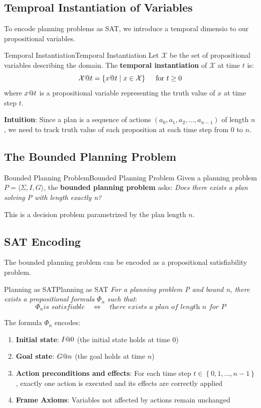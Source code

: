 \documentclass[a4paper]{article}
\theoremstyle{definition}
\begin{document}
\subsection{Temproal Instantiation of Variables}
To encode planning problems as SAT, we introduce a temporal dimensio to our propositional variables.
\begin{definition}{Temporal Instantiation}{Temporal Instantiation}
Let \( \mathcal{X} \) be the set of propositional variables describing the domain. The \textbf{temporal instantiation} 
of \( \mathcal{X} \) at time \( t \) is:
\[
  \mathcal{X}\symbol{64}t = \left\{ x\symbol{64}t \;|\; x \in \mathcal{X} \right\} \quad \text{ for } t \geq 0
\] 
where \( x\symbol{64}t \) is a propositional variable representing the truth value of \( x \) at time step \( t \).
\end{definition}
\textbf{Intuition}: Since a plan is a sequence of actions \( (a_0,a_1,a_2, \ldots, a_{n - 1}) \) of length \( n \), 
we need to track truth value of each proposition at each time step from \( 0 \) to \( n \).
\subsection{The Bounded Planning Problem}
\begin{definition}{Bounded Planning Problem}{Bounded Planning Problem}
Given a planning problem \( P = \langle \Sigma, I, G \rangle \), the \textbf{bounded planning problem} asks:
\vspace{0.5em}
\noindent
\newline
\textit{Does there exists a plan solving P with length exactly n?}
\end{definition}
This is a decision problem parametrized by the plan length \( n \).
\subsection{SAT Encoding}
The bounded planning problem can be encoded as a propositional satisfiability problem.
\begin{theorem}{Planning as SAT}{Planning as SAT}
\textit{For a planning problem P and bound n, there exists a propositional formula} \( \Phi_{n} \) \textit{such that}:
\[
  \Phi_{n} \textit{is satisfiable} \quad \Leftrightarrow \quad \textit{there exists a plan of length n for P}
\]
\end{theorem}
The formula \( \Phi_{n} \) encodes:
\begin{enumerate}
    \item \textbf{Initial state}: \( I\symbol{64}0 \) (the initial state holds at time 0)
    \item \textbf{Goal state}: \( G\symbol{64}n \) (the goal holds at time $n$)
    \item \textbf{Action preconditions and effects}: For each time step \( t \in \left\{0,1, \ldots, n - 1 \right\} \), exactly one action is executed and its effects are correctly applied
    \item \textbf{Frame Axioms}: Variables not affected by actions remain unchanged
\end{enumerate}
\end{document}
